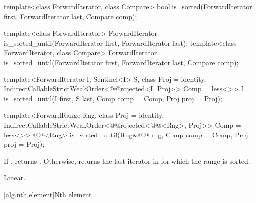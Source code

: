 \begin{removedblock}
%
\begin{itemdecl}
template<class ForwardIterator, class Compare>
  bool is_sorted(ForwardIterator first, ForwardIterator last,
    Compare comp);
\end{itemdecl}

\begin{itemdescr}
\pnum
\returns {}
\end{itemdescr}
\end{removedblock}

%
\begin{removedblock}
\begin{itemdecl}
template<class ForwardIterator>
  ForwardIterator is_sorted_until(ForwardIterator first, ForwardIterator last);
template<class ForwardIterator, class Compare>
  ForwardIterator is_sorted_until(ForwardIterator first, ForwardIterator last,
    Compare comp);
\end{itemdecl}
\end{removedblock}
\begin{addedblock}
\begin{itemdecl}
template<ForwardIterator I, Sentinel<I> S, class Proj = identity,
    IndirectCallableStrictWeakOrder<@@rojected<I, Proj>> Comp = less<>>
  I is_sorted_until(I first, S last, Comp comp = Comp{}, Proj proj = Proj{});

template<ForwardRange Rng, class Proj = identity,
    IndirectCallableStrictWeakOrder<@@rojected<@@<Rng>, Proj>> Comp = less<>>
  @@<Rng>
    is_sorted_until(Rng&@\newtxt{\&}@ rng, Comp comp = Comp{}, Proj proj = Proj{});
\end{itemdecl}
\end{addedblock}

\begin{itemdescr}
\pnum
\returns If , returns
. Otherwise, returns
the last iterator  in  for which the
range  is sorted.

\pnum
\complexity Linear.
\end{itemdescr}

[alg.nth.element]{Nth element}

